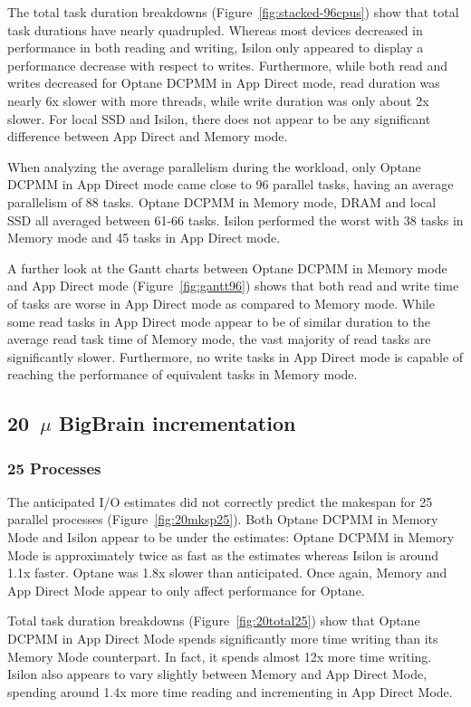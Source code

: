 \documentclass[conference]{IEEEtran}
\newcommand{\bigbrain}{BigBrain\xspace}
\begin{document}
The total task duration breakdowns (Figure~\ref{fig:stacked-96cpus}) show that total task durations
have nearly quadrupled. Whereas most devices decreased in performance in both reading and writing,
Isilon only appeared to display a performance decrease with respect to writes. Furthermore, while both
read and writes decreased for Optane DCPMM in App Direct mode, read duration was nearly 6x slower with more threads,
while write duration was only about 2x slower. For local SSD and Isilon, there does not appear to 
be any significant difference between App Direct and Memory mode.

When analyzing the average parallelism during the workload, only Optane DCPMM in App Direct mode
came close to 96 parallel tasks, having an average parallelism of 88 tasks. Optane DCPMM in Memory mode,
DRAM and local SSD all averaged between 61-66 tasks. Isilon performed the worst with 38 tasks in Memory 
mode and 45 tasks in App Direct mode.

A further look at the Gantt charts between Optane DCPMM in Memory mode and App Direct mode (Figure~\ref{fig:gantt96})
shows that both read and write time of tasks are worse in App Direct mode as compared to Memory mode.
While some read tasks in App Direct mode appear to be of similar duration to the average read task time
of Memory mode, the vast majority of read tasks are significantly slower. Furthermore, no write tasks in App
Direct mode is capable of reaching the performance of equivalent tasks in Memory mode.

\subsection{20~$\mu$ \bigbrain incrementation}
\subsubsection{25 Processes}

The anticipated I/O estimates did not correctly predict the makespan for 25 parallel
processes (Figure~\ref{fig:20mksp25}). Both Optane DCPMM in Memory Mode and Isilon appear 
to be under the estimates: Optane DCPMM in Memory Mode is approximately twice as fast as the
estimates whereas Isilon is around 1.1x faster. Optane was 1.8x slower than anticipated.
Once again, Memory and App Direct Mode appear to only affect performance for Optane.

Total task duration breakdowns (Figure~\ref{fig:20total25}) show that Optane DCPMM in
App Direct Mode spends significantly more time writing than its Memory Mode counterpart.
In fact, it spends almost 12x more time writing. Isilon also appears to vary slightly
between Memory and App Direct Mode, spending around 1.4x more time reading and incrementing
in App Direct Mode. 
\end{document}
